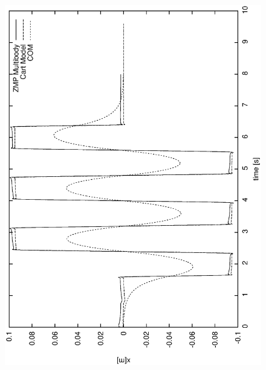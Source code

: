 \begin{figure}[htb]
\begin{center}
\includegraphics[width=\linewidth]{./figures/PatternGenerator/ThirdFigureZMPMB_X}

\end{center}
\end{figure}
